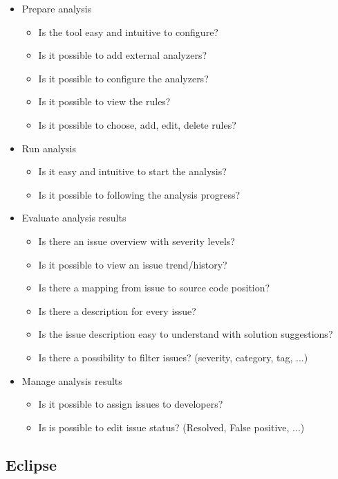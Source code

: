 \documentclass[conference]{IEEEtran}
\begin{document}
\begin{itemize}
	\item Prepare analysis
	\begin{itemize}
		\item Is the tool easy and intuitive to configure?
		\item Is it possible to add external analyzers?
		\item Is it possible to configure the analyzers?
		\item Is it possible to view the rules?
		\item Is it possible to choose, add, edit, delete rules?
	\end{itemize}
	\item Run analysis
	\begin{itemize}
		\item Is it easy and intuitive to start the analysis?
		\item Is it possible to following the analysis progress?
	\end{itemize}
	\item Evaluate analysis results
	\begin{itemize}
		\item Is there an issue overview with severity levels?
		\item Is it possible to view an issue trend/history?
		\item Is there a mapping from issue to source code position?
		\item Is there a description for every issue?
		\item Is the issue description easy to understand with solution suggestions?
		\item Is there a possibility to filter issues? (severity, category, tag, ...)
	\end{itemize}
	\item Manage analysis results
	\begin{itemize}
		\item Is it possible to assign issues to developers?
		\item Is is possible to edit issue status? (Resolved, False positive, ...)
	\end{itemize}
\end{itemize}




\subsection{Eclipse}
\label{subsec:evaluation_eclipse}
\end{document}

